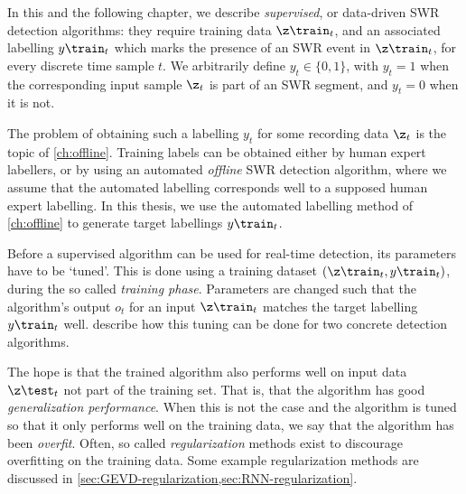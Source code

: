 \label{sec:data-driven-algorithms}

In this and the following chapter, we describe \emph{supervised}, or data-driven SWR detection algorithms: they require training data $\z\train_t$, and an associated labelling $y\train_t$ which marks the presence of an SWR event in $\z\train_t$, for every discrete time sample $t$. We arbitrarily define $y_t \in \{0, 1\}$, with $y_t = 1$ when the corresponding input sample $\z_t$ is part of an SWR segment, and $y_t = 0$ when it is not.

The problem of obtaining such a labelling $y_t$ for some recording data $\z_t$ is the topic of \cref{ch:offline}. Training labels can be obtained either by human expert labellers, or by using an automated \emph{offline} SWR detection algorithm, where we assume that the automated labelling corresponds well to a supposed human expert labelling. In this thesis, we use the automated labelling method of \cref{ch:offline} to generate target labellings $y\train_t$.

Before a supervised algorithm can be used for real-time detection, its parameters have to be `tuned'. This is done using a training dataset $(\z\train_t, y\train_t)$, during the so called \emph{training phase}. Parameters are changed such that the algorithm's output $o_t$ for an input $\z\train_t$ matches the target labelling $y\train_t$ well.  describe how this tuning can be done for two concrete detection algorithms.

The hope is that the trained algorithm also performs well on input data $\z\test_t$ not part of the training set. That is, that the algorithm has good \emph{generalization performance}. When this is not the case and the algorithm is tuned so that it only performs well on the training data, we say that the algorithm has been \emph{overfit}. Often, so called \emph{regularization} methods exist to discourage overfitting on the training data. Some example regularization methods are discussed in \cref{sec:GEVD-regularization,sec:RNN-regularization}.
